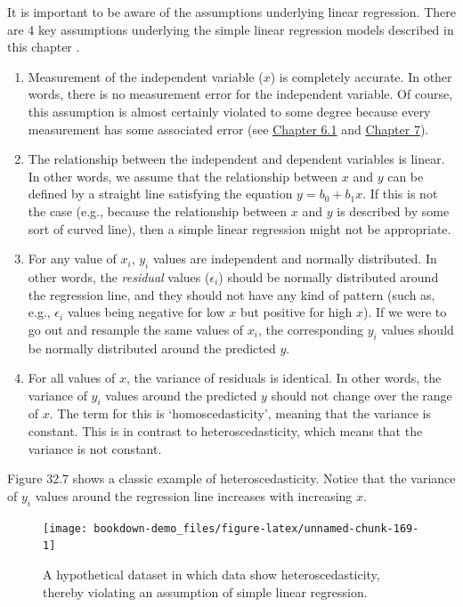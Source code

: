 \documentclass[
]{scrbook}
\begin{document}
It is important to be aware of the assumptions underlying linear regression.
There are 4 key assumptions underlying the simple linear regression models described in this chapter \citep{Sokal1995}.

\begin{enumerate}
\def\labelenumi{\arabic{enumi}.}
\item
  Measurement of the independent variable (\(x\)) is completely accurate. In other words, there is no measurement error for the independent variable.
  Of course, this assumption is almost certainly violated to some degree because every measurement has some associated error (see \protect\hyperlink{accuracy}{Chapter 6.1} and \protect\hyperlink{Chapter_7}{Chapter 7}).
\item
  The relationship between the independent and dependent variables is linear.
  In other words, we assume that the relationship between \(x\) and \(y\) can be defined by a straight line satisfying the equation \(y = b_{0} + b_{1}x\).
  If this is not the case (e.g., because the relationship between \(x\) and \(y\) is described by some sort of curved line), then a simple linear regression might not be appropriate.
\item
  For any value of \(x_{i}\), \(y_{i}\) values are independent and normally distributed.
  In other words, the \emph{residual} values (\(\epsilon_{i}\)) should be normally distributed around the regression line, and they should not have any kind of pattern (such as, e.g., \(\epsilon_{i}\) values being negative for low \(x\) but positive for high \(x\)).
  If we were to go out and resample the same values of \(x_{i}\), the corresponding \(y_{i}\) values should be normally distributed around the predicted \(y\).
\item
  For all values of \(x\), the variance of residuals is identical.
  In other words, the variance of \(y_{i}\) values around the predicted \(y\) should not change over the range of \(x\).
  The term for this is `homoscedasticity', meaning that the variance is constant.
  This is in contrast to heteroscedasticity, which means that the variance is not constant.
\end{enumerate}

Figure 32.7 shows a classic example of heteroscedasticity.
Notice that the variance of \(y_{i}\) values around the regression line increases with increasing \(x\).

\begin{figure}
\texttt{[image: bookdown-demo\_files/figure-latex/unnamed-chunk-169-1]} \caption{A hypothetical dataset in which data show heteroscedasticity, thereby violating an assumption of simple linear regression.}\label{fig:unnamed-chunk-169}
\end{figure}
\end{document}
